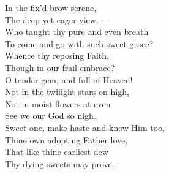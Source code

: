  In the fix’d brow serene, \\
 The deep yet eager view. — \\
  Who taught thy pure and even breath \\
 To come and go with such sweet grace? \\
 Whence thy reposing Faith, \\
 Though in our frail embrace? \\
  O tender gem, and full of Heaven! \\
 Not in the twilight stars on high, \\
 Not in moist flowers at even \\
 See we our God so nigh. \\
  Sweet one, make haste and know Him too, \\
 Thine own adopting Father love, \\
 That like thine earliest dew \\
 Thy dying sweets may prove.\\



